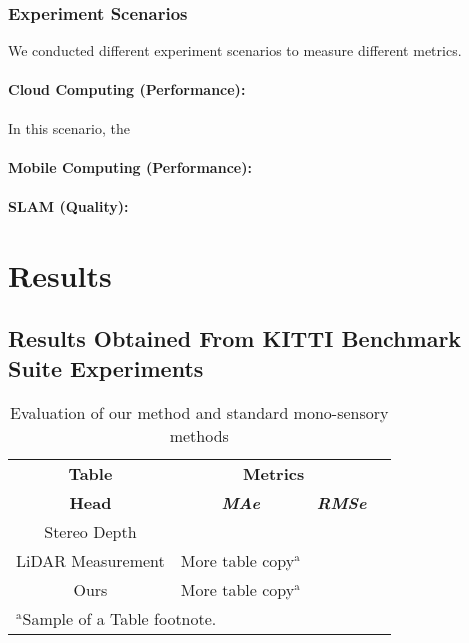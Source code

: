 \documentclass[conference]{IEEEtran}
\begin{document}
\subsubsection{Experiment Scenarios}
We conducted different experiment scenarios to measure different metrics.
\paragraph{Cloud Computing (Performance):}
In  this scenario, the 
\paragraph{Mobile Computing (Performance):}
\paragraph{SLAM (Quality):}


\section{Results}

\subsection{Results Obtained From KITTI Benchmark Suite Experiments}

\begin{table}[htbp]
    \caption{Evaluation of our method and standard mono-sensory methods}
    \begin{center}
        \begin{tabular}{|c|c|c|}
            \hline
            \textbf{Table}&\multicolumn{2}{|c|}{\textbf{Metrics}} \\
            \cline{2-3} 
            \textbf{Head} & \textbf{\textit{MAe}}& \textbf{\textit{RMSe}} \\
            \hline
            Stereo Depth& &   \\
            \hline
            LiDAR Measurement& More table copy$^{\mathrm{a}}$& \\
            \hline
            Ours& More table copy$^{\mathrm{a}}$& \\
            \hline
            \multicolumn{4}{l}{$^{\mathrm{a}}$Sample of a Table footnote.}
        \end{tabular}
        \label{tab1}
    \end{center}
\end{table}
\end{document}
